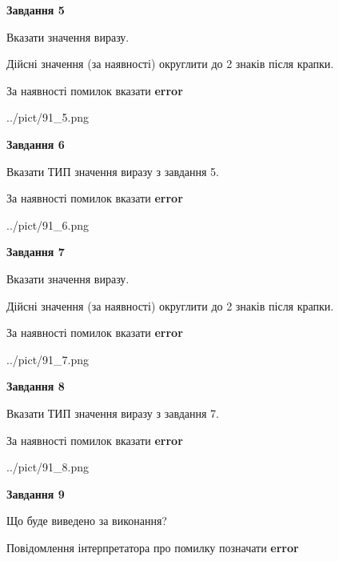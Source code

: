 \documentclass[11pt, ukrainian]{article}
\begin{document}
{\begin {large}
{\begin {center}\textbf{Завдання 5}\end {center}}\par
Вказати значення виразу. \par
Дійсні значення (за наявності) округлити до 2 знаків після крапки. \par
За наявності помилок вказати \textbf{error}

\begin{center}
	{../pict/91_5.png}
\end{center}
\newpage

{\begin {center}\textbf{Завдання 6}\end {center}}\par
Вказати ТИП значення виразу з завдання 5. \par
За наявності помилок вказати \textbf{error}

\begin{center}
	{../pict/91_6.png}
\end{center}
\newpage

{\begin {center}\textbf{Завдання 7}\end {center}}\par
Вказати значення виразу. \par
Дійсні значення (за наявності) округлити до 2 знаків після крапки. \par
За наявності помилок вказати \textbf{error}

\begin{center}
	{../pict/91_7.png}
\end{center}
\newpage

{\begin {center}\textbf{Завдання 8}\end {center}}\par
Вказати ТИП значення виразу з завдання 7. \par
За наявності помилок вказати \textbf{error}

\begin{center}
	{../pict/91_8.png}
\end{center}
\newpage

{\begin {center}\textbf{Завдання 9}\end {center}}\par
Що буде виведено за виконання? \par
Повідомлення інтерпретатора про помилку позначати \textbf{error}


\end{large}}
\end{document}

